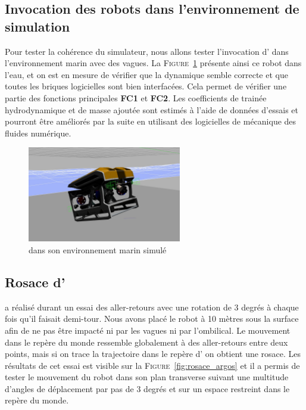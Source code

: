 		\subsection{Invocation des robots dans l'environnement de simulation}

			Pour tester la cohérence du simulateur, nous allons tester l'invocation d'\argos{} dans l'environnement marin avec des vagues. La \textsc{Figure}~\ref{fig:argos_sea} présente ainsi ce robot dans l'eau, et on est en mesure de vérifier que la dynamique semble correcte et que toutes les briques logicielles sont bien interfacées. Cela permet de vérifier une partie des fonctions principales \textbf{FC1} et \textbf{FC2}. Les coefficients de trainée hydrodynamique et de masse ajoutée sont estimés à l'aide de données d'essais et pourront être améliorés par la suite en utilisant des logicielles de mécanique des fluides numérique.

			\begin{figure}
				\centering
				\includegraphics[width=0.6\textwidth]{imgs/argos_gazebo_sea.jpg}
				\caption{\argos{} dans son environnement marin simulé}
				\label{fig:argos_sea}
			\end{figure}

		\subsection{Rosace d'\argos{}}

			\argos{} a réalisé durant un essai des aller-retours avec une rotation de 3 degrés à chaque fois qu'il faisait demi-tour. Nous avons placé le robot à 10 mètres sous la surface afin de ne pas être impacté ni par les vagues ni par l'ombilical. Le mouvement dans le repère du monde ressemble globalement à des aller-retours entre deux points, mais si on trace la trajectoire dans le repère d'\argos{} on obtient une rosace. Les résultats de cet essai est visible sur la \textsc{Figure}~\ref{fig:rosace_argos} et il a permis de tester le mouvement du robot dans son plan transverse suivant une multitude d'angles de déplacement par pas de 3 degrés et sur un espace restreint dans le repère du monde.

